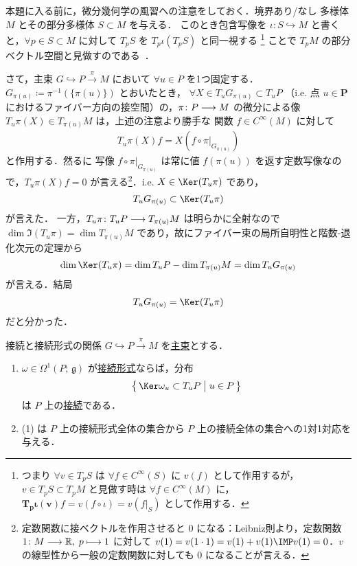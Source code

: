 \documentclass[TQFT_main]{subfiles}
\begin{document}
本題に入る前に，微分幾何学の風習への注意をしておく．境界あり/なし \cinfty 多様体 $M$ とその部分多様体 $S \subset M$ を与える．
このとき包含写像を $\iota \colon S \hookrightarrow M$ と書くと，$\forall p \in S \subset M$ に対して $T_p S$ を $T_p \iota (T_p S)$ と同一視する
\footnote{
    つまり $\forall v \in T_p S$ は $\forall f \in C^\infty (S)$ に $v(f)$ として作用するが，$v \in T_p S \subset T_p M$ と見做す時は $\forall f \in C^\infty (M)$ に，$\bm{T_p \iota(v)}f = v(f \circ \iota) = v(f|_S)$ として作用する．
}
ことで $T_p M$ の部分ベクトル空間と見做すのである~\cite[p.116]{Lee2012smooth}．

さて，主束 $G \hookrightarrow P \xrightarrow{\pi} M$ において $\forall u \in P$ を1つ固定する．
$G_{\pi(u)} \coloneqq \pi^{-1}(\{\pi(u)\})$ とおいたとき，
$\forall X \in T_u G_{\pi(u)} \subset T_u P$ （i.e. 点 $u \in \bm{P}$ におけるファイバー方向の接空間）の，$\pi \colon P \longrightarrow M$ の微分による像 $T_u \pi (X) \in T_{\pi(u)} M$ は，上述の注意より勝手な \cinfty 関数 $f \in C^\infty (M)$ に対して
\begin{align}
    T_u \pi (X)f = X(f \circ \pi|_{G_{\pi(u)}})
\end{align}
と作用する．然るに \cinfty 写像 $f \circ \pi|_{G_{\pi(u)}}$ は常に値 $f(\pi(u))$ を返す定数写像なので，$T_u \pi (X)f = 0$ が言える\footnote{定数関数に接ベクトルを作用させると $0$ になる：Leibniz則より，定数関数 $1 \colon M \longrightarrow \mathbb{R},\;p \longmapsto 1$ に対して $v(1) = v(1\cdot 1) = v(1) + v(1) \IMP v(1) = 0$．$v$ の線型性から一般の定数関数に対しても $0$ になることが言える．}．i.e. $X \in \Ker (T_u \pi)$ であり，
\begin{align}
    T_u G_{\pi(u)} \subset \Ker (T_u \pi)
\end{align}
が言えた．
一方，$T_u \pi \colon T_u P \longrightarrow T_{\pi(u)} M$ は明らかに全射なので $\dim \Im (T_u \pi) = \dim T_{\pi(u)} M$ であり，故にファイバー束の局所自明性と階数-退化次元の定理から
\begin{align}
    \dim \Ker (T_u \pi) = \dim T_u P - \dim T_{\pi(u)} M = \dim T_u G_{\pi(u)}
\end{align}
が言える．結局
\begin{align}
    \label{eq:tangent-fiber}
    T_u G_{\pi(u)} = \Ker (T_u \pi)
\end{align}
だと分かった．


\begin{mytheo}[label=thm:connection-basic]{接続と接続形式の関係}
    $G \hookrightarrow P \xrightarrow{\pi} M$ を\hyperref[def.PFD]{主束}とする．
    \begin{enumerate}
        \item $\omega \in \Omega^1(P;\, \mathfrak{g})$ が\hyperref[def:connection]{接続形式}ならば，分布 
        \begin{align}
            \bigl\{\, \Ker \omega_u \subset T_u P\bigm| u \in P \,\bigr\} 
        \end{align}
        は $P$ 上の\hyperref[def:connection]{接続}である．
        \item (1) は $P$ 上の接続形式全体の集合から $P$ 上の接続全体の集合への1対1対応を与える．
    \end{enumerate}
\end{mytheo}
\end{document}
